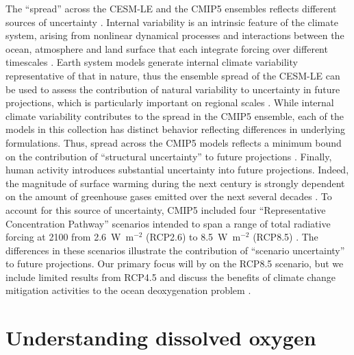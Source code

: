 \documentclass{report_chapter}
\begin{document}
The ``spread'' across the CESM-LE and the CMIP5 ensembles reflects different sources of uncertainty \citep{Hawkins-Sutton-2009}.
Internal variability is an intrinsic feature of the climate system, arising from nonlinear dynamical processes and interactions between the ocean, atmosphere and land surface that each integrate forcing over different timescales \citep{Hasselmann-1976}.
Earth system models generate internal climate variability representative of that in nature, thus the ensemble spread of the CESM-LE can be used to assess the contribution of natural variability to uncertainty in future projections, which is particularly important on regional scales \citep{Deser-Phillips-etal-2012,Lovenduski-McKinley-etal-2016,McKinley-Pilcher-etal-2016}.
While internal climate variability contributes to the spread in the CMIP5 ensemble, each of the models in this collection has distinct behavior reflecting differences in underlying formulations.
Thus, spread across the CMIP5 models reflects a minimum bound on the contribution of ``structural uncertainty'' to future projections \citep{Hawkins-Sutton-2009,Lovenduski-McKinley-etal-2016}.
Finally, human activity introduces substantial uncertainty into future projections.
Indeed, the magnitude of surface warming during the next century is strongly dependent on the amount of greenhouse gases emitted over the next several decades \citep{Collins-Knutti-etal-2013}.
To account for this source of uncertainty, CMIP5 included four ``Representative Concentration Pathway'' scenarios intended to span a range of total radiative forcing at 2100 from 2.6~W~m$^{-2}$ (RCP2.6) to 8.5~W~m$^{-2}$ (RCP8.5) \citep{Meinshausen-Smith-etal-2011}.
The differences in these scenarios illustrate the contribution of ``scenario uncertainty'' to future projections.
Our primary focus will by on the RCP8.5 scenario, but we include limited results from RCP4.5 and discuss the benefits of climate change mitigation activities to the ocean deoxygenation problem \citep{Henson-Beaulieu-etal-2017}.

\section{Understanding dissolved oxygen}\label{loc:o2-distributions}
\end{document}
